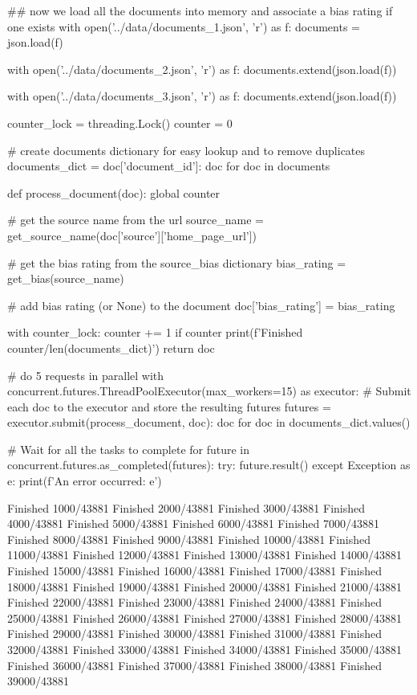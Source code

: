 \begin{pyin}
\## now we load all the documents into memory and associate a bias rating if one exists
with open('../data/documents_1.json', 'r') as f:
    documents = json.load(f)

with open('../data/documents_2.json', 'r') as f:
    documents.extend(json.load(f))

with open('../data/documents_3.json', 'r') as f:
    documents.extend(json.load(f))

counter_lock = threading.Lock()
counter = 0

# create documents dictionary for easy lookup and to remove duplicates
documents_dict = {doc['document_id']: doc for doc in documents}

def process_document(doc):
    global counter

    # get the source name from the url
    source_name = get_source_name(doc['source']['home_page_url'])

    # get the bias rating from the source_bias dictionary
    bias_rating = get_bias(source_name)

    # add bias rating (or None) to the document
    doc['bias_rating'] = bias_rating

    with counter_lock:
        counter += 1
        if counter %
            print(f'Finished {counter}/{len(documents_dict)}')
    return doc

# do 5 requests in parallel
with concurrent.futures.ThreadPoolExecutor(max_workers=15) as executor:
    # Submit each doc to the executor and store the resulting futures
    futures = {executor.submit(process_document, doc): doc for doc in documents_dict.values()}

    # Wait for all the tasks to complete
    for future in concurrent.futures.as_completed(futures):
        try:
            future.result()
        except Exception as e:
            print(f'An error occurred: {e}')
\end{pyin}

\begin{pyprint}
Finished 1000/43881
Finished 2000/43881
Finished 3000/43881
Finished 4000/43881
Finished 5000/43881
Finished 6000/43881
Finished 7000/43881
Finished 8000/43881
Finished 9000/43881
Finished 10000/43881
Finished 11000/43881
Finished 12000/43881
Finished 13000/43881
Finished 14000/43881
Finished 15000/43881
Finished 16000/43881
Finished 17000/43881
Finished 18000/43881
Finished 19000/43881
Finished 20000/43881
Finished 21000/43881
Finished 22000/43881
Finished 23000/43881
Finished 24000/43881
Finished 25000/43881
Finished 26000/43881
Finished 27000/43881
Finished 28000/43881
Finished 29000/43881
Finished 30000/43881
Finished 31000/43881
Finished 32000/43881
Finished 33000/43881
Finished 34000/43881
Finished 35000/43881
Finished 36000/43881
Finished 37000/43881
Finished 38000/43881
Finished 39000/43881
\end{pyprint}

